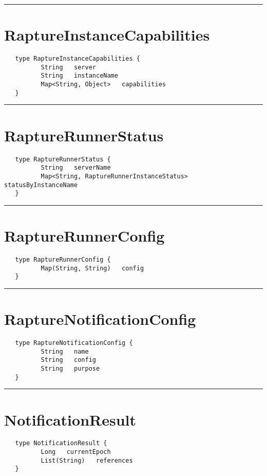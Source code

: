 \rule{15cm}{2pt}
\section{RaptureInstanceCapabilities}
\label{type:RaptureInstanceCapabilities}

\begin{verbatim}
   type RaptureInstanceCapabilities {
          String   server
          String   instanceName
          Map<String, Object>   capabilities
   }
\end{verbatim}

\rule{15cm}{2pt}
\section{RaptureRunnerStatus}
\label{type:RaptureRunnerStatus}

\begin{verbatim}
   type RaptureRunnerStatus {
          String   serverName
          Map<String, RaptureRunnerInstanceStatus>   statusByInstanceName
   }
\end{verbatim}

\rule{15cm}{2pt}
\section{RaptureRunnerConfig}
\label{type:RaptureRunnerConfig}

\begin{verbatim}
   type RaptureRunnerConfig {
          Map(String, String)   config
   }
\end{verbatim}

\rule{15cm}{2pt}
\section{RaptureNotificationConfig}
\label{type:RaptureNotificationConfig}

\begin{verbatim}
   type RaptureNotificationConfig {
          String   name
          String   config
          String   purpose
   }
\end{verbatim}

\rule{15cm}{2pt}
\section{NotificationResult}
\label{type:NotificationResult}

\begin{verbatim}
   type NotificationResult {
          Long   currentEpoch
          List(String)   references
   }
\end{verbatim}

